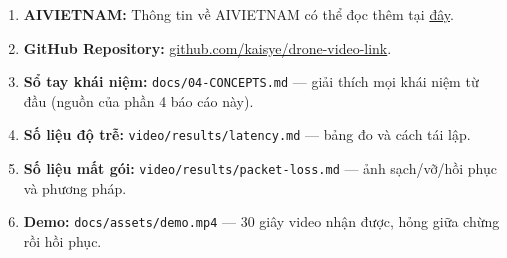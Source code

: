 \documentclass[12pt]{ai_conquer2026}
\begin{document}
\newpage
\begin{appendices}
\begin{enumerate}
\item \textbf{AIVIETNAM:} Thông tin về AIVIETNAM có thể đọc thêm tại \href{https://aivietnam.edu.vn/}{đây}.
\item \textbf{GitHub Repository:} \href{https://github.com/kaisye/drone-video-link}{github.com/kaisye/drone-video-link}.
\item \textbf{Sổ tay khái niệm:} \texttt{docs/04-CONCEPTS.md} --- giải thích mọi khái niệm từ đầu (nguồn của phần 4 báo cáo này).
\item \textbf{Số liệu độ trễ:} \texttt{video/results/latency.md} --- bảng đo và cách tái lập.
\item \textbf{Số liệu mất gói:} \texttt{video/results/packet-loss.md} --- ảnh sạch/vỡ/hồi phục và phương pháp.
\item \textbf{Demo:} \texttt{docs/assets/demo.mp4} --- 30 giây video nhận được, hỏng giữa chừng rồi hồi phục.
\end{enumerate}
\end{appendices}
\end{document}
